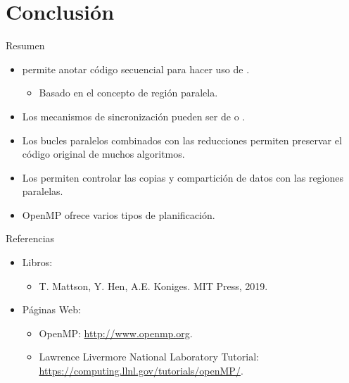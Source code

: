 \section{Conclusión}

\begin{frame}[t]{Resumen}
\begin{itemize}
  \item {} permite anotar código secuencial para
        hacer uso de .
    \begin{itemize}
      \item Basado en el concepto de región paralela.
    \end{itemize}

  \item Los mecanismos de sincronización pueden ser de 
         o .

  \item Los bucles paralelos combinados con las reducciones permiten
        preservar el código original de muchos algoritmos.

  \item Los  permiten controlar
        las copias y compartición de datos con las regiones paralelas.

  \item OpenMP ofrece varios tipos de planificación.
\end{itemize}
\end{frame}


\begin{frame}[t]{Referencias}
\begin{itemize}
  \item Libros:
    \begin{itemize}
      \item {}
            T. Mattson, Y. Hen, A.E. Koniges.
            MIT Press, 2019.
    \end{itemize}
  \item Páginas Web:
    \begin{itemize}
      \item OpenMP: \url{http://www.openmp.org}.
      \item Lawrence Livermore National Laboratory Tutorial: \url{https://computing.llnl.gov/tutorials/openMP/}.
    \end{itemize}
\end{itemize}
\end{frame}
